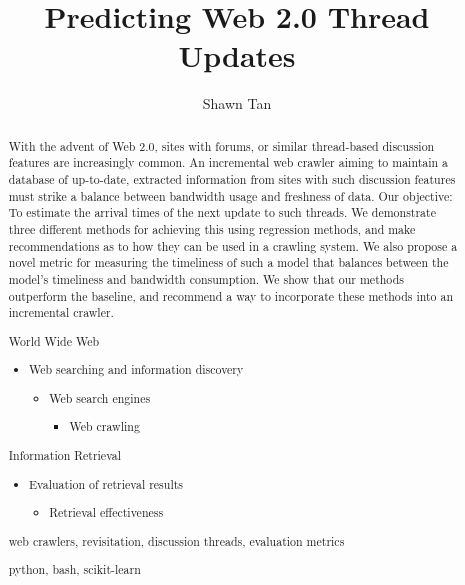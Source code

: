 \documentclass[hyp,12pt]{socreport}
\begin{document}

\title{Predicting Web 2.0 Thread Updates}
\author{Shawn Tan}
\maketitle
\begin{abstract}
With the advent of Web 2.0, sites with forums, or similar thread-based
discussion features are increasingly common. An incremental web crawler aiming 
to maintain a database of up-to-date, extracted information from sites with such 
discussion features must strike a balance between bandwidth usage and freshness 
of data. Our objective: To estimate the arrival times of the next update to such 
threads. We demonstrate three different methods for achieving this using 
regression methods, and make recommendations as to how they can be used in a 
crawling system. We also propose a novel metric for measuring the timeliness of 
such a model that balances between the model's timeliness and bandwidth 
consumption. We show that our methods outperform the baseline, and recommend a 
way to incorporate these methods into an incremental crawler.

\begin{descriptors}
\item World Wide Web
	\begin{itemize}
	\item[] Web searching and information discovery
		\begin{itemize}
		\item[] Web search engines
			\begin{itemize}
			\item[] Web crawling
			\end{itemize}
		\end{itemize}
	\end{itemize}
	\item[] Information Retrieval
		\begin{itemize}
		\item[] Evaluation of retrieval results
			\begin{itemize}
			\item[] Retrieval effectiveness
			\end{itemize}
		\end{itemize}
\end{descriptors}
\begin{keywords}
	web crawlers, revisitation, discussion threads, evaluation metrics
\end{keywords}
\begin{implement}
	python, bash, scikit-learn\nocite{scikit-learn}
\end{implement}
\end{abstract}
\end{document}
